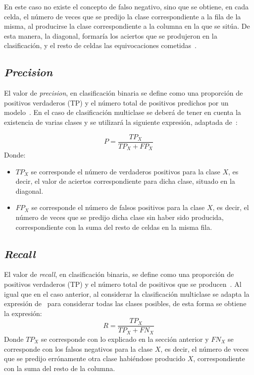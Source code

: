 En este caso no existe el concepto de falso negativo, sino que se obtiene, en cada celda, el número de veces que se predijo la clase correspondiente a la fila de la misma, al producirse la clase correspondiente a la columna en la que se sitúa. De esta manera, la diagonal, formaría los aciertos que se produjeron en la clasificación, y el resto de celdas las equivocaciones cometidas~\cite{kolo2011binary}.


\subsection{\textit{Precision}}
El valor de \textit{precision}, en clasificación binaria se define como una proporción de positivos verdaderos (TP) y el número total de positivos predichos por un modelo~\cite{FAWCETT2006861}. En el caso de clasificación multiclase se deberá de tener en cuenta la existencia de varias clases y se utilizará la siguiente expresión, adaptada de~\cite{FAWCETT2006861}:

$$P = \frac{TP_X}{TP_X + FP_X} $$
Donde:
\begin{itemize}
	\item $TP_X$ se corresponde el número de verdaderos positivos para la clase $X$, es decir, el valor de aciertos correspondiente para dicha clase, situado en la diagonal.
	\item $FP_X$ se corresponde el número de falsos positivos para la clase $X$, es decir, el número de veces que se predijo dicha clase sin haber sido producida, correspondiente con la suma del resto de celdas en la misma fila.
\end{itemize}

\subsection{\textit{Recall}}
El valor de \textit{recall}, en clasificación binaria, se define como una proporción de positivos verdaderos (TP) y el número total de positivos que se producen~\cite{FAWCETT2006861}. Al igual que en el caso anterior, al considerar la clasificación multiclase se adapta la expresión de~\cite{FAWCETT2006861} para considerar todas las clases posibles, de esta forma se obtiene la expresión:
$$R = \frac{TP_X}{TP_X +FN_X} $$
Donde $TP_X$ se corresponde con lo explicado en la sección anterior y $FN_X$ se corresponde con los falsos negativos para la clase $X$, es decir, el número de veces que se predijo errónamente otra clase habiéndose producido $X$, correspondiente con la suma del resto de la columna. 